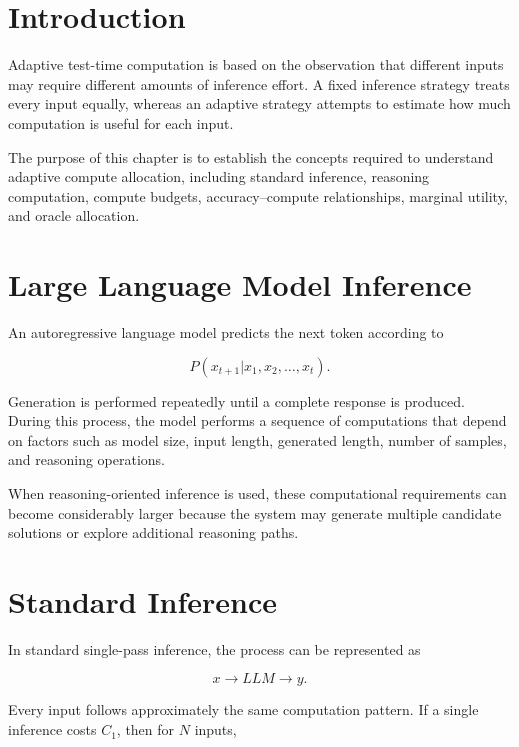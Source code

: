 \documentclass[12pt,a4paper,titlepage]{report}
\begin{document}
\section{Introduction}

Adaptive test-time computation is based on the observation that different inputs may require different amounts of inference effort. A fixed inference strategy treats every input equally, whereas an adaptive strategy attempts to estimate how much computation is useful for each input.

The purpose of this chapter is to establish the concepts required to understand adaptive compute allocation, including standard inference, reasoning computation, compute budgets, accuracy--compute relationships, marginal utility, and oracle allocation.

\section{Large Language Model Inference}

An autoregressive language model predicts the next token according to

\begin{equation}
P(x_{t+1}|x_1,x_2,\ldots,x_t).
\end{equation}

Generation is performed repeatedly until a complete response is produced. During this process, the model performs a sequence of computations that depend on factors such as model size, input length, generated length, number of samples, and reasoning operations.

When reasoning-oriented inference is used, these computational requirements can become considerably larger because the system may generate multiple candidate solutions or explore additional reasoning paths.

\section{Standard Inference}

In standard single-pass inference, the process can be represented as

\begin{equation}
x\rightarrow LLM\rightarrow y.
\end{equation}

Every input follows approximately the same computation pattern. If a single inference costs $C_1$, then for $N$ inputs,
\end{document}
